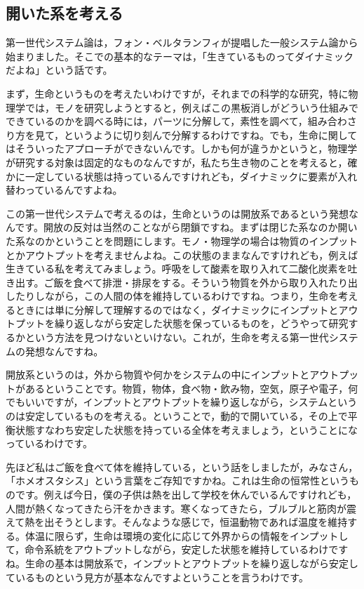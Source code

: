 \documentclass{ltjsbook}
\begin{document}
\subsection{開いた系を考える}

第一世代システム論は，フォン・ベルタランフィが提唱した一般システム論から始まりました。そこでの基本的なテーマは，「生きているものってダイナミックだよね」という話です。

まず，生命というものを考えたいわけですが，それまでの科学的な研究，特に物理学では，モノを研究しようとすると，例えばこの黒板消しがどういう仕組みでできているのかを調べる時には，パーツに分解して，素性を調べて，組み合わさり方を見て，というように切り刻んで分解するわけですね。でも，生命に関してはそういったアプローチができないんです。しかも何が違うかというと，物理学が研究する対象は固定的なものなんですが，私たち生き物のことを考えると，確かに一定している状態は持っているんですけれども，ダイナミックに要素が入れ替わっているんですよね。

この第一世代システムで考えるのは，生命というのは開放系であるという発想なんです。開放の反対は当然のことながら閉鎖ですね。まずは閉じた系なのか開いた系なのかということを問題にします。モノ・物理学の場合は物質のインプットとかアウトプットを考えませんよね。この状態のままなんですけれども，例えば生きている私を考えてみましょう。呼吸をして酸素を取り入れて二酸化炭素を吐き出す。ご飯を食べて排泄・排尿をする。そういう物質を外から取り入れたり出したりしながら，この人間の体を維持しているわけですね。つまり，生命を考えるときには単に分解して理解するのではなく，ダイナミックにインプットとアウトプットを繰り返しながら安定した状態を保っているものを，どうやって研究するかという方法を見つけないといけない。これが，生命を考える第一世代システムの発想なんですね。

開放系というのは，外から物質や何かをシステムの中にインプットとアウトプットがあるということです。物質，物体，食べ物・飲み物，空気，原子や電子，何でもいいですが，インプットとアウトプットを繰り返しながら，システムというのは安定しているものを考える。ということで，動的で開いている，その上で平衡状態すなわち安定した状態を持っている全体を考えましょう，ということになっているわけです。

先ほど私はご飯を食べて体を維持している，という話をしましたが，みなさん，「ホメオスタシス」という言葉をご存知ですかね。これは生命の恒常性というものです。例えば今日，僕の子供は熱を出して学校を休んでいるんですけれども，人間が熱くなってきたら汗をかきます。寒くなってきたら，ブルブルと筋肉が震えて熱を出そうとします。そんなような感じで，恒温動物であれば温度を維持する。体温に限らず，生命は環境の変化に応じて外界からの情報をインプットして，命令系統をアウトプットしながら，安定した状態を維持しているわけですね。生命の基本は開放系で，インプットとアウトプットを繰り返しながら安定しているものという見方が基本なんですよということを言うわけです。
\end{document}
